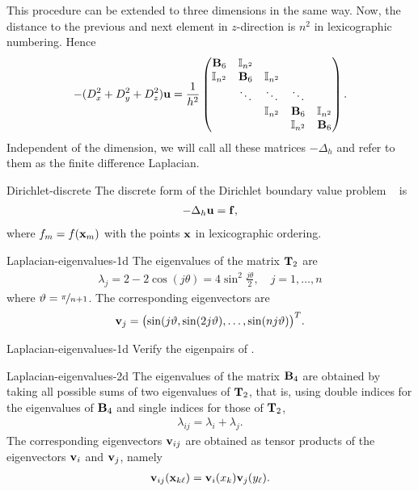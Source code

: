 \begin{remark}
  This procedure can be extended to three dimensions in the same
  way. Now, the distance to the previous and next element in
  $z$-direction is $n^2$ in lexicographic numbering. Hence
  \begin{gather}
    -(D_x^2+D_y^2+D_z^2) \vu = \frac1{h^2}
    \begin{pmatrix}
      \matb_6 & \id_{n^2} \\
      \id_{n^2} & \matb_6 & \id_{n^2} \\
      &\ddots & \ddots & \ddots \\
      &&\id_{n^2} & \matb_6 & \id_{n^2} \\
      &&&\id_{n^2} & \matb_6 \\
    \end{pmatrix}.
  \end{gather}
  Independent of the dimension, we will call all these matrices
  $-\Delta_h$ and refer to them as the finite difference Laplacian.
\end{remark}

\begin{Example}{Dirichlet-discrete}
  The discrete form of the Dirichlet boundary value problem
  ~ is
  \begin{gather}
    -\Delta_h \vu = \vf,
  \end{gather}
  where $f_m = f(\vx_m)$ with the points $\vx$ in lexicographic ordering.
\end{Example}

\begin{Lemma}{Laplacian-eigenvalues-1d}
  The eigenvalues of the matrix $\matt_2$ are
  \begin{gather}
    \lambda_j = 2 - 2\cos(j\theta) = 4 \sin^2 \frac{j\theta}2,
    \quad j=1,\dots, n
  \end{gather}
  where $\theta = \nicefrac{\pi}{n+1}$. The corresponding eigenvectors are
  \begin{gather}
    \vv_j = \bigl(\sin(j\theta,\sin(2j\theta),\dots,\sin(nj\theta)\bigr)^T.
  \end{gather}
\end{Lemma}

\begin{Problem}{Laplacian-eigenvalues-1d}
  Verify the eigenpairs of .
\end{Problem}

\begin{Lemma}{Laplacian-eigenvalues-2d}
  The eigenvalues of the matrix $\matb_4$ are obtained by taking all
  possible sums of two eigenvalues of $\matt_2$, that is, using double
  indices for the eigenvalues of $\matb_4$ and single indices for
  those of $\matt_2$,
  \begin{gather}
    \lambda_{ij} = \lambda_i+\lambda_j.
  \end{gather}
  The corresponding eigenvectors $\vv_{ij}$ are obtained as tensor
  products of the eigenvectors $\vv_i$ and $\vv_j$, namely
  \begin{gather}
    \vv_{ij}(\vx_{k\ell}) = \vv_i(x_k)\vv_j(y_\ell).
  \end{gather}
\end{Lemma}


